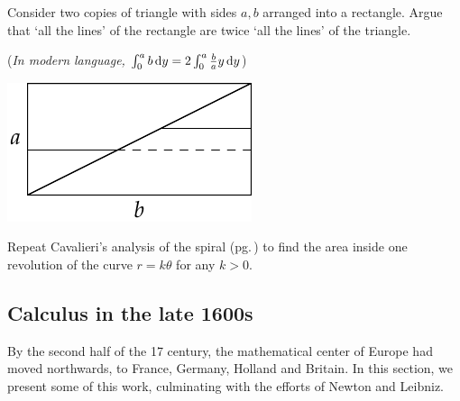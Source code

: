 \begin{exercises}{}{}
\begin{enumerate}
		\begin{minipage}[t]{0.6\linewidth}\vspace{0pt}
			\item Consider two copies of triangle with sides $a,b$ arranged into a rectangle. Argue that `all the lines' of the rectangle are twice `all the lines' of the triangle.\par
			(\emph{In modern language, $\int_0^ab\,{\mathrm{d} y}=2\int_0^a\frac bay\,{\mathrm{d} y}$}) 
		\end{minipage}
		\hfill
		\begin{minipage}[t]{0.39\linewidth}\vspace{0pt}
			\flushright\includegraphics{analytic-torri3}
		\end{minipage}\par
		
		\item Repeat Cavalieri's analysis of the spiral (pg.\,\pageref{pg:cavspiral}) to find the area inside one revolution of the curve $r=k\theta$ for any $k>0$.
		
	\end{enumerate}
\end{exercises}


\clearpage




\subsection{Calculus in the late 1600s}

By the second half of the 17\th{} century, the mathematical center of Europe had moved northwards, to France, Germany, Holland and Britain. In this section, we present some of this work, culminating with the efforts of Newton and Leibniz.\par

